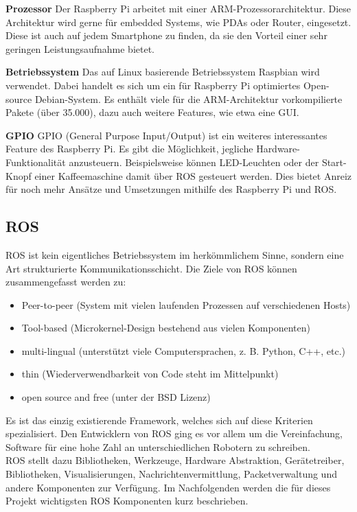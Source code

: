 \documentclass[12pt]{article}
\begin{document}
{\bf Prozessor} Der Raspberry Pi arbeitet mit einer ARM-Prozessorarchitektur.
Diese Architektur wird gerne für embedded Systems, wie PDAs oder Router, eingesetzt. Diese ist auch auf jedem Smartphone zu finden, da sie den Vorteil einer sehr geringen Leistungsaufnahme bietet. \cite{ARM}

{\bf Betriebssystem} Das auf Linux basierende Betriebssystem Raspbian wird verwendet.
Dabei handelt es sich um ein für Raspberry Pi optimiertes Open-source Debian-System.
Es enthält viele für die ARM-Architektur vorkompilierte Pakete (über 35.000), dazu auch weitere Features, wie etwa eine GUI. \cite{Raspbian}

{\bf GPIO} GPIO (General Purpose Input/Output) ist ein weiteres interessantes Feature des Raspberry Pi.
Es gibt die Möglichkeit, jegliche Hardware-Funktionalität anzusteuern.
Beispielsweise können LED-Leuchten oder der Start-Knopf einer Kaffeemaschine damit über ROS gesteuert werden.
Dies bietet Anreiz für noch mehr Ansätze und Umsetzungen mithilfe des Raspberry Pi und ROS.

\subsection{ROS} 
ROS ist kein eigentliches Betriebssystem im herkömmlichem Sinne, sondern eine Art strukturierte Kommunikationsschicht.
Die Ziele von ROS können zusammengefasst werden zu:
\begin{itemize}
\item Peer-to-peer (System mit vielen laufenden Prozessen auf verschiedenen Hosts)
\item Tool-based (Microkernel-Design bestehend aus vielen Komponenten)
\item multi-lingual (unterstützt viele Computersprachen, z. B. Python, C++, etc.)
\item thin (Wiederverwendbarkeit von Code steht im Mittelpunkt)
\item open source and free (unter der BSD Lizenz) \cite{SLAM}
\end{itemize}
Es ist das einzig existierende Framework, welches sich auf diese Kriterien spezialisiert.
Den Entwicklern von ROS ging es vor allem um die Vereinfachung, Software für eine hohe Zahl an unterschiedlichen Robotern zu schreiben. \\
ROS stellt dazu Bibliotheken, Werkzeuge, Hardware Abstraktion, Gerätetreiber, Bibliotheken, Visualisierungen, Nachrichtenvermittlung, Packetverwaltung und andere Komponenten zur Verfügung. \cite{ROSdescr}
Im Nachfolgenden werden die für dieses Projekt wichtigsten ROS Komponenten kurz beschrieben.
\end{document}
